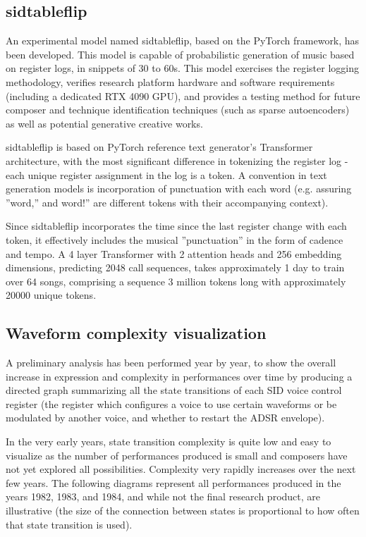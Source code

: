 \documentclass[10pt]{article}
\begin{document}
\begin{multicols*}{2}
\subsection{sidtableflip}
\label{sidtableflip}

An experimental model named sidtableflip\cite{sidtableflip}, based on the PyTorch framework, has been developed. This model is capable of probabilistic generation of music based on register logs, in snippets of 30 to 60s. This model exercises the register logging methodology, verifies research platform hardware and software requirements (including a dedicated RTX 4090 GPU), and provides a testing method for future composer and technique identification techniques (such as sparse autoencoders)  as well as potential generative creative works.

sidtableflip is based on PyTorch reference text generator’s Transformer architecture\cite{pytexample}, with the most significant difference in tokenizing the register log - each unique register assignment in the log is a token. A convention in text generation models is incorporation of punctuation with each word (e.g. assuring ”word,” and word!” are different tokens with their accompanying context).

Since sidtableflip incorporates the time since the last register change with each token, it effectively includes the musical ”punctuation” in the form of cadence and tempo. A 4 layer Transformer with 2 attention heads and 256 embedding dimensions, predicting 2048 call sequences, takes approximately 1 day to train over 64 songs, comprising a sequence 3 million tokens long with approximately 20000 unique tokens.

\subsection{Waveform complexity visualization}
\label{complexity}

A preliminary analysis has been performed year by year, to show the overall increase in expression and complexity in performances over time by producing a directed graph summarizing all the state transitions of each SID voice control register (the register which configures a voice to use certain waveforms or be modulated by another voice, and whether to restart the ADSR envelope).

In the very early years, state transition complexity is quite low and easy to visualize as the number of performances produced is small and composers have not yet explored all possibilities. Complexity very rapidly increases over the next few years. The following diagrams represent all performances produced in the years 1982, 1983, and 1984, and while not the final research product, are illustrative (the size of the connection between states is proportional to how often that state transition is used).


\end{multicols*}
\end{document}
